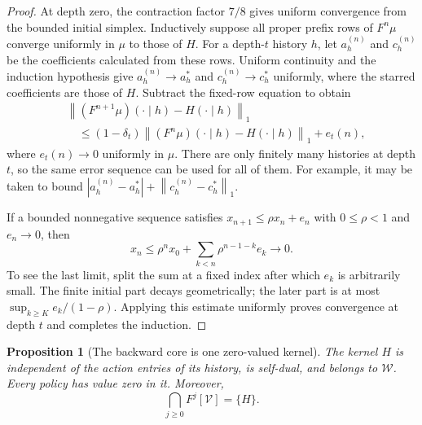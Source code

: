 \documentclass[11pt]{article}
\newtheorem{proposition}[theorem]{Proposition}
\theoremstyle{definition}
\theoremstyle{remark}
\newcommand{\V}{\mathcal V}
\newcommand{\W}{\mathcal W}
\newcommand{\norm}[1]{\left\lVert#1\right\rVert}
\begin{document}
\begin{proof}
At depth zero, the contraction factor $7/8$ gives uniform convergence
from the bounded initial simplex.  Inductively suppose all proper
prefix rows of $F^n\mu$ converge uniformly in $\mu$ to those of $H$.
For a depth-$t$ history $h$, let $a_h^{(n)}$ and $c_h^{(n)}$ be the
coefficients calculated from these rows.  Uniform continuity and the
induction hypothesis give
$a_h^{(n)}\to a_h^*$ and $c_h^{(n)}\to c_h^*$ uniformly, where
the starred coefficients are those of $H$.  Subtract the fixed-row
equation to obtain
\begin{align*}
 &\norm{(F^{n+1}\mu)(\cdot\mid h)-H(\cdot\mid h)}_1\\
 &\quad\le (1-\delta_t)
       \norm{(F^n\mu)(\cdot\mid h)-H(\cdot\mid h)}_1
       + e_t(n),
\end{align*}
where $e_t(n)\to0$ uniformly in $\mu$.  There are only finitely
many histories at depth $t$, so the same error sequence can be used
for all of them.  For example, it may be taken to bound
$|a_h^{(n)}-a_h^*|+\norm{c_h^{(n)}-c_h^*}_1$.

If a bounded nonnegative sequence satisfies
$x_{n+1}\le\rho x_n+e_n$ with $0\le\rho<1$ and $e_n\to0$,
then
\[
  x_n\le\rho^nx_0+\sum_{k<n}\rho^{n-1-k}e_k\longrightarrow0.
\]
To see the last limit, split the sum at a fixed index after which
$e_k$ is arbitrarily small.  The finite initial part decays
geometrically; the later part is at most
$\sup_{k\ge K}e_k/(1-\rho)$.  Applying this estimate uniformly
proves convergence at depth $t$ and completes the induction.
\end{proof}

\begin{proposition}[The backward core is one zero-valued kernel]
\label{prop:core}
The kernel $H$ is independent of the action entries of its history,
is self-dual, and belongs to $\W$.  Every policy has value zero in it.
Moreover,
\begin{equation}
  \bigcap_{j\ge0}F^j[\V]=\{H\}.
  \label{eq:core}
\end{equation}
\end{proposition}
\end{document}

